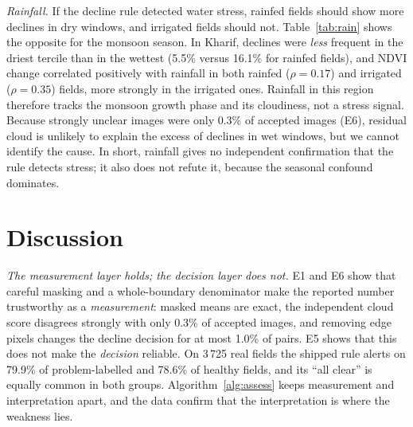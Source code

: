 \documentclass[conference]{IEEEtran}
\begin{document}
\textit{Rainfall.} If the decline rule detected water stress, rainfed fields should show more declines in dry windows, and irrigated fields should not. Table~\ref{tab:rain} shows the opposite for the monsoon season. In Kharif, declines were \emph{less} frequent in the driest tercile than in the wettest (5.5\% versus 16.1\% for rainfed fields), and NDVI change correlated positively with rainfall in both rainfed ($\rho=0.17$) and irrigated ($\rho=0.35$) fields, more strongly in the irrigated ones. Rainfall in this region therefore tracks the monsoon growth phase and its cloudiness, not a stress signal. Because strongly unclear images were only 0.3\% of accepted images (E6), residual cloud is unlikely to explain the excess of declines in wet windows, but we cannot identify the cause. In short, rainfall gives no independent confirmation that the rule detects stress; it also does not refute it, because the seasonal confound dominates.

\section{Discussion}
\textit{The measurement layer holds; the decision layer does not.} E1 and E6 show that careful masking and a whole-boundary denominator make the reported number trustworthy as a \emph{measurement}: masked means are exact, the independent cloud score disagrees strongly with only 0.3\% of accepted images, and removing edge pixels changes the decline decision for at most 1.0\% of pairs. E5 shows that this does not make the \emph{decision} reliable. On 3\,725 real fields the shipped rule alerts on 79.9\% of problem-labelled and 78.6\% of healthy fields, and its ``all clear'' is equally common in both groups. Algorithm~\ref{alg:assess} keeps measurement and interpretation apart, and the data confirm that the interpretation is where the weakness lies.
\end{document}
